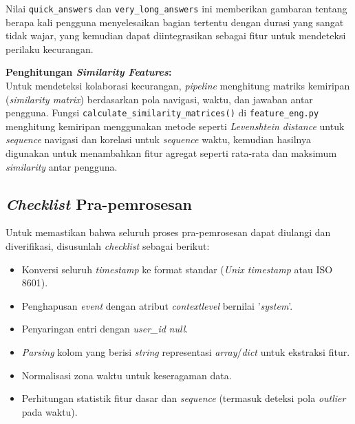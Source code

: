 Nilai \texttt{quick\_answers} dan \texttt{very\_long\_answers} ini memberikan gambaran tentang berapa kali pengguna menyelesaikan bagian tertentu dengan durasi yang sangat tidak wajar, yang kemudian dapat diintegrasikan sebagai fitur untuk mendeteksi perilaku kecurangan.

\textbf{Penghitungan \textit{Similarity Features}:} \\
Untuk mendeteksi kolaborasi kecurangan, \textit{pipeline} menghitung matriks kemiripan (\textit{similarity matrix}) berdasarkan pola navigasi, waktu, dan jawaban antar pengguna. Fungsi \texttt{calculate\_similarity\_matrices()} di \texttt{feature\_eng.py} menghitung kemiripan menggunakan metode seperti \textit{Levenshtein distance} untuk \textit{sequence} navigasi dan korelasi untuk \textit{sequence} waktu, kemudian hasilnya digunakan untuk menambahkan fitur agregat seperti rata-rata dan maksimum \textit{similarity} antar pengguna.




\subsection{\textit{Checklist} Pra-pemrosesan}
\label{sec:checklistPraPemrosesan}
Untuk memastikan bahwa seluruh proses pra-pemrosesan dapat diulangi dan diverifikasi, disusunlah \textit{checklist} sebagai berikut:
\begin{itemize}
    \item Konversi seluruh \textit{timestamp} ke format standar (\textit{Unix timestamp} atau ISO 8601).
    \item Penghapusan \textit{event} dengan atribut \textit{contextlevel} bernilai '\textit{system}'.
    \item Penyaringan entri dengan \textit{user\_id} \textit{null}.
    \item \textit{Parsing} kolom yang berisi \textit{string} representasi \textit{array}/\textit{dict} untuk ekstraksi fitur.
    \item Normalisasi zona waktu untuk keseragaman data.
    \item Perhitungan statistik fitur dasar dan \textit{sequence} (termasuk deteksi pola \textit{outlier} pada waktu).
\end{itemize}

